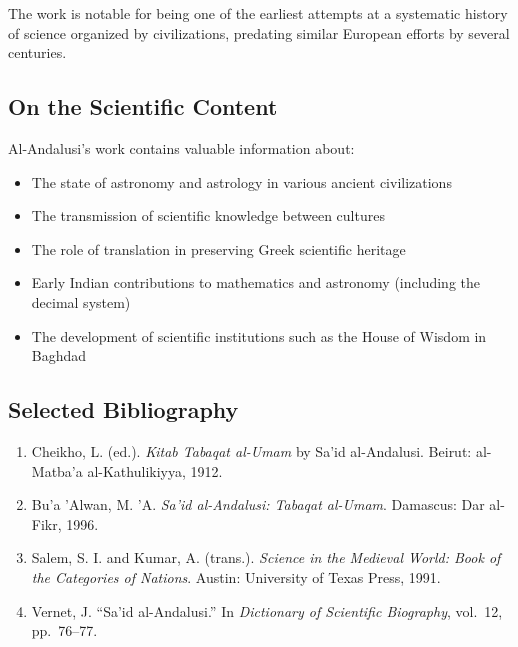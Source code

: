 \documentclass[11pt,a4paper]{article}
\begin{document}
The work is notable for being one of the earliest attempts at a systematic history of science organized by civilizations, predating similar European efforts by several centuries.

\subsection*{On the Scientific Content}

Al-Andalusi's work contains valuable information about:

\begin{itemize}
  \item The state of astronomy and astrology in various ancient civilizations
  \item The transmission of scientific knowledge between cultures
  \item The role of translation in preserving Greek scientific heritage
  \item Early Indian contributions to mathematics and astronomy (including the decimal system)
  \item The development of scientific institutions such as the House of Wisdom in Baghdad
\end{itemize}

\subsection*{Selected Bibliography}

\begin{enumerate}
  \item Cheikho, L. (ed.). \textit{Kitab Tabaqat al-Umam} by Sa'id al-Andalusi. Beirut: al-Matba'a al-Kathulikiyya, 1912.
  \item Bu'a 'Alwan, M. 'A. \textit{Sa'id al-Andalusi: Tabaqat al-Umam}. Damascus: Dar al-Fikr, 1996.
  \item Salem, S. I. and Kumar, A. (trans.). \textit{Science in the Medieval World: Book of the Categories of Nations}. Austin: University of Texas Press, 1991.
  \item Vernet, J. ``Sa'id al-Andalusi.'' In \textit{Dictionary of Scientific Biography}, vol.~12, pp.~76--77.
\end{enumerate}
\end{document}
